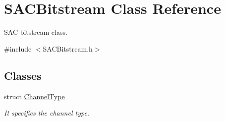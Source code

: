 \hypertarget{class_s_a_c_bitstream}{}\section{S\+A\+C\+Bitstream Class Reference}
\label{class_s_a_c_bitstream}


S\+AC bitstream class.  




{\ttfamily \#include $<$S\+A\+C\+Bitstream.\+h$>$}

\subsection*{Classes}
\begin{DoxyCompactItemize}
\item 
struct \hyperlink{struct_s_a_c_bitstream_1_1_channel_type}{Channel\+Type}
\begin{DoxyCompactList}\small\item\em It specifies the channel type. \end{DoxyCompactList}\end{DoxyCompactItemize}
